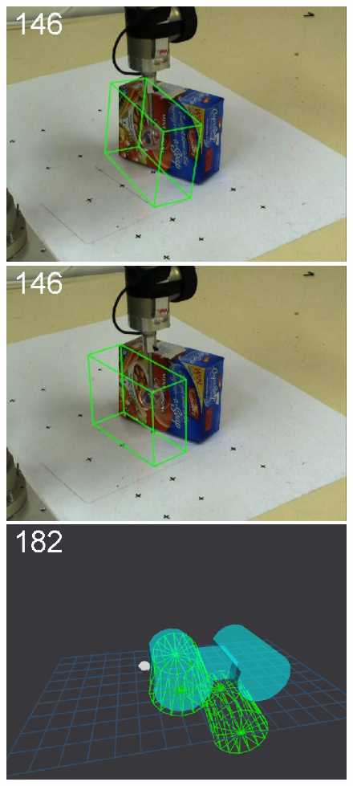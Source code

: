 \begin{figure}[t]
{\includegraphics[width=\imgCXwid]{images/C1_1exp_87_3}
\includegraphics[width=\imgCXwid]{images/C1_LWPR1_87_3}
\includegraphics[width=\imgCXwid]{images/C5_1exp_6_3}
}
\end{figure}

